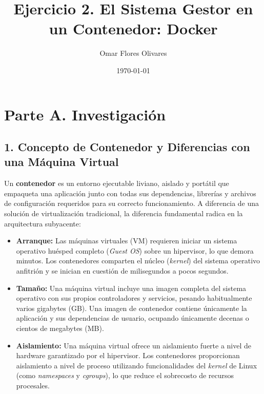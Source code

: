 \documentclass[12pt,letterpaper]{article}
\title{\textbf{Ejercicio 2. El Sistema Gestor en un Contenedor: Docker}}
\author{Omar Flores Olivares}
\date{\today}
\begin{document}
\maketitle

\section*{Parte A. Investigación}

\subsection*{1. Concepto de Contenedor y Diferencias con una Máquina Virtual}
Un \textbf{contenedor} es un entorno ejecutable liviano, aislado y portátil que empaqueta una aplicación junto con todas sus dependencias, librerías y archivos de configuración requeridos para su correcto funcionamiento. A diferencia de una solución de virtualización tradicional, la diferencia fundamental radica en la arquitectura subyacente:

\begin{itemize}
    \item \textbf{Arranque:} Las máquinas virtuales (VM) requieren iniciar un sistema operativo huésped completo (\textit{Guest OS}) sobre un hipervisor, lo que demora minutos. Los contenedores comparten el núcleo (\textit{kernel}) del sistema operativo anfitrión y se inician en cuestión de milisegundos a pocos segundos.
    \item \textbf{Tamaño:} Una máquina virtual incluye una imagen completa del sistema operativo con sus propios controladores y servicios, pesando habitualmente varios gigabytes (GB). Una imagen de contenedor contiene únicamente la aplicación y sus dependencias de usuario, ocupando únicamente decenas o cientos de megabytes (MB).
    \item \textbf{Aislamiento:} Una máquina virtual ofrece un aislamiento fuerte a nivel de hardware garantizado por el hipervisor. Los contenedores proporcionan aislamiento a nivel de proceso utilizando funcionalidades del \textit{kernel} de Linux (como \textit{namespaces} y \textit{cgroups}), lo que reduce el sobrecosto de recursos procesales.
\end{itemize}
\end{document}
